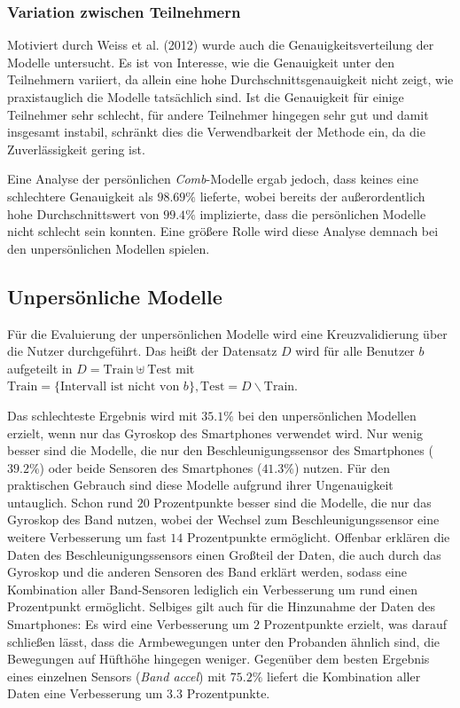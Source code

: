 \subsubsection{Variation zwischen Teilnehmern}
Motiviert durch Weiss et al. (2012) \cite{Weiss2012} wurde auch die Genauigkeitsverteilung der Modelle untersucht. Es ist von Interesse, wie die Genauigkeit unter den Teilnehmern variiert, da allein eine hohe Durchschnittsgenauigkeit nicht zeigt, wie praxistauglich die Modelle tatsächlich sind. Ist die Genauigkeit für einige Teilnehmer sehr schlecht, für andere Teilnehmer hingegen sehr gut und damit insgesamt instabil, schränkt dies die Verwendbarkeit der Methode ein, da die Zuverlässigkeit gering ist.

Eine Analyse der persönlichen \textit{Comb}-Modelle ergab jedoch, dass keines eine schlechtere Genauigkeit als $98.69 \%$ lieferte, wobei bereits der außerordentlich hohe Durchschnittswert von $99.4 \%$ implizierte, dass die persönlichen Modelle nicht schlecht sein konnten. Eine größere Rolle wird diese Analyse demnach bei den unpersönlichen Modellen spielen.

\subsection{Unpersönliche Modelle}
\label{subsec:eval-impersonal-models}
Für die Evaluierung der unpersönlichen Modelle wird eine Kreuzvalidierung über die Nutzer durchgeführt. Das heißt der Datensatz $D$ wird für alle Benutzer $b$ aufgeteilt in $D = \text{Train} \uplus \text{Test}$ mit $\text{Train} = \{\text{Intervall ist nicht von } b\}, \text{Test} = D \backslash \text{Train}$.

Das schlechteste Ergebnis wird mit $35.1 \%$ bei den unpersönlichen Modellen erzielt, wenn nur das Gyroskop des Smartphones verwendet wird. Nur wenig besser sind die Modelle, die nur den Beschleunigungssensor des Smartphones ($39.2 \%$) oder beide Sensoren des Smartphones ($41.3 \%$) nutzen. Für den praktischen Gebrauch sind diese Modelle aufgrund ihrer Ungenauigkeit untauglich. Schon rund $20 $ Prozentpunkte besser sind die Modelle, die nur das Gyroskop des Band nutzen, wobei der Wechsel zum Beschleunigungssensor eine weitere Verbesserung um fast $14$ Prozentpunkte ermöglicht. Offenbar erklären die Daten des Beschleunigungssensors einen Großteil der Daten, die auch durch das Gyroskop und die anderen Sensoren des Band erklärt werden, sodass eine Kombination aller Band-Sensoren lediglich ein Verbesserung um rund einen Prozentpunkt ermöglicht. Selbiges gilt auch für die Hinzunahme der Daten des Smartphones: Es wird eine Verbesserung um $2$ Prozentpunkte erzielt, was darauf schließen lässt, dass die Armbewegungen unter den Probanden ähnlich sind, die Bewegungen auf Hüfthöhe hingegen weniger. Gegenüber dem besten Ergebnis eines einzelnen Sensors (\textit{Band accel}) mit $75.2 \%$ liefert die Kombination aller Daten eine Verbesserung um $3.3$ Prozentpunkte.

